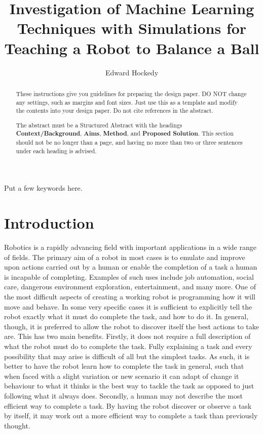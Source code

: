 \documentclass[12pt,a4paper]{article}
\title{Investigation of Machine Learning Techniques with Simulations for Teaching a Robot to Balance a Ball}
\author{Edward Hockedy}
\date{}
\begin{document}
\maketitle

\begin{abstract}
These instructions give you guidelines for preparing the design paper.  DO NOT change any settings, such as margins and font sizes.  Just use this as a template and modify the contents into your design paper.  Do not cite references in the abstract.

The abstract must be a Structured Abstract with the headings {\bf Context/Background}, {\bf Aims}, {\bf Method}, and {\bf Proposed Solution}.  This section should not be no longer than a page, and having no more than two or three sentences under each heading is advised.
\end{abstract}

\begin{keywords}
Put a few keywords here.
\end{keywords}

\section{Introduction}
Robotics is a rapidly advancing field with important applications in a wide range of fields. The primary aim of a robot in most cases is to emulate and improve upon actions carried out by a human or enable the completion of a task a human is incapable of completing. Examples of such uses include job automation, social care, dangerous environment exploration, entertainment, and many more. One of the most difficult aspects of creating a working robot is programming how it will move and behave. In some very specific cases it is sufficient to explicitly tell the robot exactly what it must do complete the task, and how to do it. In general, though, it is preferred to allow the robot to discover itself the best actions to take are. This has two main benefits. Firstly, it does not require a full description of what the robot must do to complete the task. Fully explaining a task and every possibility that may arise is difficult of all but the simplest tasks. As such, it is better to have the robot learn how to complete the task in general, such that when faced with a slight variation or new scenario it can adapt of change it behaviour to what it thinks is the best way to tackle the task as opposed to just following what it always does. Secondly, a human may not describe the most efficient way to complete a task. By having the robot discover or observe a task by itself, it may work out a more efficient way to complete a task than previously thought. 
\end{document}
